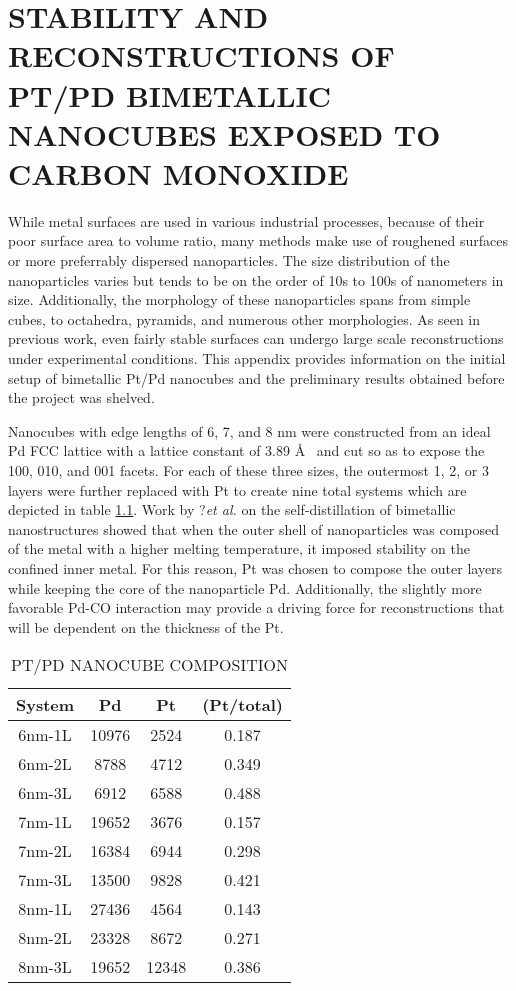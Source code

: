 
\chapter{STABILITY AND RECONSTRUCTIONS OF PT/PD BIMETALLIC NANOCUBES EXPOSED TO CARBON MONOXIDE}

While metal surfaces are used in various industrial processes, because of their
poor surface area to volume ratio, many methods make use of roughened surfaces
or more preferrably dispersed nanoparticles. The size distribution of the
nanoparticles varies but tends to be on the order of 10s to 100s of nanometers
in size. Additionally, the morphology of these nanoparticles spans from simple
cubes, to octahedra, pyramids, and numerous other morphologies.\citep{} As seen
in previous work\cite{Michalka, Tao}, even fairly stable surfaces can undergo
large scale reconstructions under experimental conditions. This appendix
provides information on the initial setup of bimetallic Pt/Pd nanocubes and the
preliminary results obtained before the project was shelved. 

Nanocubes with edge lengths of 6, 7, and 8 nm were constructed from an ideal Pd
FCC lattice with a lattice constant of 3.89 \AA~  and cut so as to expose the
{100}, {010}, and {001} facets. For each of these three sizes, the outermost 1,
2, or 3 layers were further replaced with Pt to create nine total systems which
are depicted in table \ref{tab:systems}. Work by ?{\it et al.}\citep{} on the
self-distillation of bimetallic nanostructures showed that when the outer shell
of nanoparticles was composed of the metal with a higher melting temperature,
it imposed stability on the confined inner metal. For this reason, Pt was
chosen to compose the outer layers while keeping the core of the nanoparticle
Pd. Additionally, the slightly more favorable Pd-CO interaction may provide a
driving force for reconstructions that will be dependent on the thickness of
the Pt.

\begin{table}
  \caption{PT/PD NANOCUBE COMPOSITION}
  \centering
  \begin{threeparttable}
  \begin{tabular}{ c ccc }
  \hline
  \hline
  \textbf{System} & \textbf{Pd} & \textbf{Pt} &  \textbf{(Pt/total)} \\
  \hline
  6nm-1L & 10976 & 2524  & 0.187 \\
  6nm-2L & 8788  & 4712  & 0.349 \\
  6nm-3L & 6912  & 6588  & 0.488 \\
  7nm-1L & 19652 & 3676  & 0.157 \\
  7nm-2L & 16384 & 6944  & 0.298 \\
  7nm-3L & 13500 & 9828  & 0.421 \\
  8nm-1L & 27436 & 4564  & 0.143 \\
  8nm-2L & 23328 & 8672  & 0.271 \\
  8nm-3L & 19652 & 12348 & 0.386 \\
  \hline
  \hline
  \end{tabular}
  \end{threeparttable}
\label{tab:systems}
\end{table}

